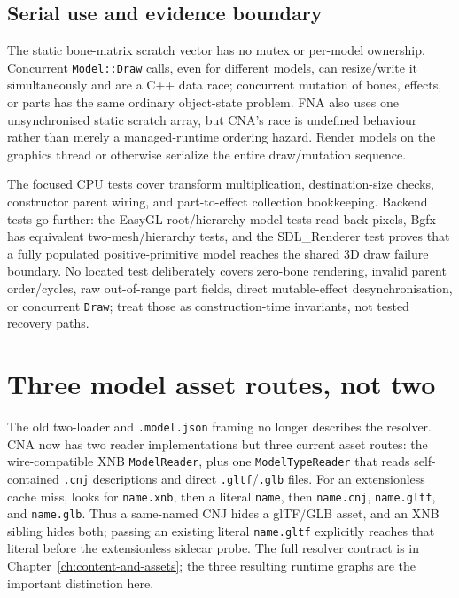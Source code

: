 \subsection{Serial use and evidence boundary}

The static bone-matrix scratch vector has no mutex or per-model ownership. Concurrent
\texttt{Model::Draw} calls, even for different models, can resize/write it simultaneously and
are a C++ data race; concurrent mutation of bones, effects, or parts has the same ordinary
object-state problem. FNA also uses one unsynchronised static scratch array, but CNA's race is
undefined behaviour rather than merely a managed-runtime ordering hazard. Render models on the
graphics thread or otherwise serialize the entire draw/mutation sequence.

The focused CPU tests cover transform multiplication, destination-size checks, constructor
parent wiring, and part-to-effect collection bookkeeping. Backend tests go further: the EasyGL
root/hierarchy model tests read back pixels, Bgfx has equivalent two-mesh/hierarchy tests, and
the SDL\_Renderer test proves that a fully populated positive-primitive model reaches the shared
3D draw failure boundary. No located test deliberately covers zero-bone rendering, invalid
parent order/cycles, raw out-of-range part fields, direct mutable-effect desynchronisation, or
concurrent \texttt{Draw}; treat those as construction-time invariants, not tested recovery
paths.

\section{Three model asset routes, not two}
\label{sec:model-loading}

The old two-loader and \texttt{.model.json} framing no longer describes the resolver.
CNA now has two reader implementations but three current  asset routes:
the wire-compatible XNB \texttt{ModelReader}, plus one \texttt{ModelTypeReader} that reads
self-contained \texttt{.cnj} descriptions and direct \texttt{.gltf}/\texttt{.glb} files. For an
extensionless cache miss,  looks for \texttt{name.xnb}, then a literal
\texttt{name}, then \texttt{name.cnj}, \texttt{name.gltf}, and \texttt{name.glb}. Thus a
same-named CNJ hides a glTF/GLB asset, and an XNB sibling hides both; passing an existing literal
\texttt{name.gltf} explicitly reaches that literal before the extensionless sidecar probe. The
full resolver contract is in Chapter~\ref{ch:content-and-assets}; the three resulting runtime
graphs are the important distinction here.

